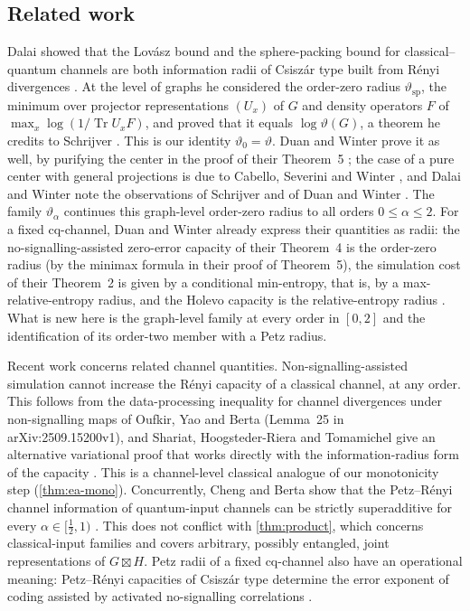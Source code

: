 \documentclass[11pt]{article}
\theoremstyle{definition}
\DeclareMathOperator{\Tr}{Tr}
\newcommand{\vt}{\vartheta}
\newcommand{\boxt}{\boxtimes}
\begin{document}
\subsection{Related work}

Dalai showed that the Lov\'asz bound and the sphere-packing bound for
classical--quantum channels are both information radii of Csisz\'ar type
\cite{Csiszar1995} built from R\'enyi divergences
\cite{Dalai2013,Dalai2013TIT}.  At the level
of graphs he considered the order-zero radius $\vt_{\mathrm{sp}}$, the
minimum over projector representations $(U_x)$ of $G$ and density operators
$F$ of $\max_x\log(1/\Tr U_xF)$, and proved that it equals $\log\vt(G)$, a
theorem he credits to Schrijver \cite[Theorem~8]{Dalai2013TIT}.  This is our
identity $\vt_0=\vt$.  Duan and Winter prove it as well, by purifying the
center in the proof of their Theorem~5 \cite[Section~V]{DuanWinter2016}; the
case of a pure center with general projections is due to Cabello, Severini
and Winter \cite{CSW2010}, and Dalai and Winter note the observations of
Schrijver and of Duan and Winter \cite{DalaiWinter2017}.  The family
$\vt_\alpha$ continues this graph-level order-zero radius to all orders
$0\le\alpha\le2$.  For a fixed cq-channel, Duan and Winter already express
their quantities as radii: the no-signalling-assisted zero-error capacity of
their Theorem~4 is the order-zero radius (by the minimax formula in their
proof of Theorem~5), the simulation cost of their Theorem~2 is given by a
conditional min-entropy, that is, by a max-relative-entropy radius, and the
Holevo capacity is the relative-entropy radius \cite{DuanWinter2016}.  What
is new here is the graph-level family at every order in $[0,2]$ and the
identification of its order-two member with a Petz radius.

Recent work concerns related channel quantities.  Non-signalling-assisted
simulation cannot increase the R\'enyi capacity of a classical channel, at
any order.  This follows from the data-processing inequality for channel
divergences under non-signalling maps of Oufkir, Yao and Berta
\cite[Lemma~24]{OYB2026} (Lemma~25 in arXiv:2509.15200v1), and Shariat,
Hoogsteder-Riera and Tomamichel give an alternative variational proof that
works directly with the information-radius form of the capacity
\cite{SHT2026}.  This is a channel-level classical analogue of our
monotonicity step (\cref{thm:ea-mono}).  Concurrently, Cheng and Berta show that the
Petz--R\'enyi channel information of quantum-input channels can be strictly
superadditive for every $\alpha\in[\frac12,1)$ \cite{ChengBerta2026}.  This
does not conflict with \cref{thm:product}, which concerns classical-input
families and covers arbitrary, possibly entangled, joint representations of
$G\boxt H$.  Petz radii of a fixed cq-channel also have an operational
meaning: Petz--R\'enyi capacities of Csisz\'ar type determine the error
exponent of coding assisted by activated no-signalling correlations
\cite{OTB2024}.
\end{document}
